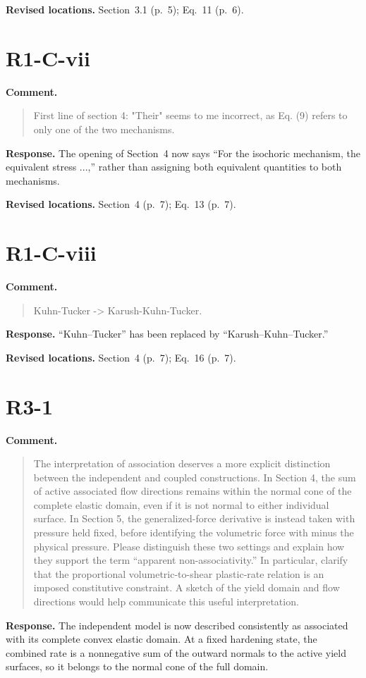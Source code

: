 \documentclass[11pt]{article}
\begin{document}
\textbf{Revised locations.} Section~3.1 (p.~5); Eq.~11 (p.~6).
\section{R1-C-vii}
\textbf{Comment.}\begin{quote}\small
First line of section 4: "Their" seems to me incorrect, as Eq. (9) refers to only one of the two mechanisms.
\end{quote}
\textbf{Response.} The opening of Section~4 now says ``For the isochoric
mechanism, the equivalent stress ...,'' rather than assigning both equivalent
quantities to both mechanisms.

\textbf{Revised locations.} Section~4 (p.~7); Eq.~13 (p.~7).
\section{R1-C-viii}
\textbf{Comment.}\begin{quote}\small
Kuhn-Tucker -> Karush-Kuhn-Tucker.
\end{quote}
\textbf{Response.} ``Kuhn--Tucker'' has been replaced by ``Karush--Kuhn--Tucker.''

\textbf{Revised locations.} Section~4 (p.~7); Eq.~16 (p.~7).
\section{R3-1}
\textbf{Comment.}\begin{quote}\small
The interpretation of association deserves a more explicit distinction between the independent and coupled constructions. In Section 4, the sum of active associated flow directions remains within the normal cone of the complete elastic domain, even if it is not normal to either individual surface. In Section 5, the generalized-force derivative is instead taken with pressure held fixed, before identifying the volumetric force with minus the physical pressure. Please distinguish these two settings and explain how they support the term “apparent non-associativity.” In particular, clarify that the proportional volumetric-to-shear plastic-rate relation is an imposed constitutive constraint. A sketch of the yield domain and flow directions would help communicate this useful interpretation.
\end{quote}
\textbf{Response.} The independent model is now described consistently as
associated with its complete convex elastic domain. At a fixed hardening state,
the combined rate is a nonnegative sum of the outward normals to the active
yield surfaces, so it belongs to the normal cone of the full domain.
\end{document}
